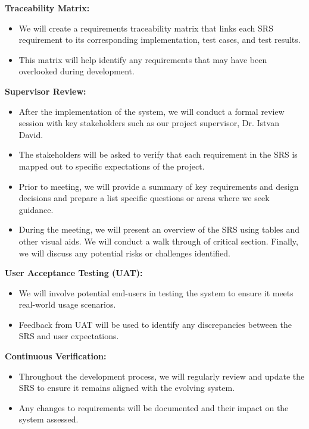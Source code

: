 \documentclass[12pt, titlepage]{article}
\begin{document}
\textbf{Traceability Matrix:}
\begin{itemize}
  \item We will create a requirements traceability matrix that links
    each SRS requirement to its corresponding implementation, test
    cases, and test results.
  \item This matrix will help identify any requirements that may have
    been overlooked during development.
\end{itemize}

\textbf{Supervisor Review:}
\begin{itemize}
  \item After the implementation of the system, we will conduct a
    formal review session with key stakeholders such as our project
    supervisor, Dr. Istvan David.
  \item The stakeholders will be asked to verify that each
    requirement in the SRS is mapped out to specific expectations of
    the project.
  \item Prior to meeting, we will provide a summary of key
    requirements and design decisions and prepare a list specific
    questions or areas where we seek guidance.
  \item During the meeting, we will present an overview of the SRS
    using tables and other visual aids. We will conduct a walk
    through of critical section. Finally, we will discuss any
    potential risks or challenges identified.
\end{itemize}

\textbf{User Acceptance Testing (UAT):}
\begin{itemize}
  \item We will involve potential end-users in testing the system to
    ensure it meets real-world usage scenarios.
  \item Feedback from UAT will be used to identify any discrepancies
    between the SRS and user expectations.
\end{itemize}

\textbf{Continuous Verification:}
\begin{itemize}
  \item Throughout the development process, we will regularly review
    and update the SRS to ensure it remains aligned with the evolving system.
  \item Any changes to requirements will be documented and their
    impact on the system assessed.
\end{itemize}
\end{document}
